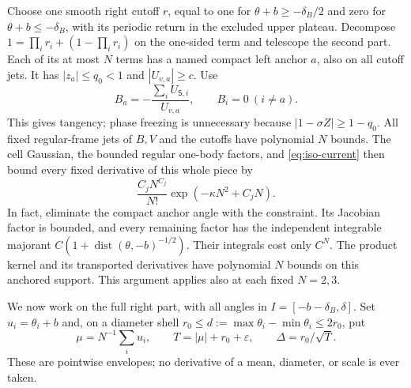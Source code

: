\documentclass[11pt]{article}
\numberwithin{equation}{section}
\theoremstyle{definition}
\newcommand{\eps}{\varepsilon}
\begin{document}
Choose one smooth right cutoff $r$, equal to one for
$\theta+b\ge-\delta_B/2$ and zero for $\theta+b\le-\delta_B$,
with its periodic return in the excluded upper plateau.  Decompose
$1=\prod_i r_i+(1-\prod_i r_i)$ on the one-sided term and telescope
the second part.  Each of its at most $N$ terms has a named compact
left anchor $a$, also on all cutoff jets.  It has
$|z_a|\le q_0<1$ and $|U_{v,a}|\ge c$.  Use
\begin{equation}\label{eq:iso-anchor-field}
 B_a=-\frac{\sum_iU_{\mathsf S,i}}{U_{v,a}},\qquad B_i=0\ (i\ne a).
\end{equation}
This gives tangency; phase freezing is unnecessary because
$|1-\sigma Z|\ge1-q_0$.  All fixed regular-frame jets of $B,V$ and
the cutoffs have polynomial $N$ bounds.  The cell Gaussian, the
bounded regular one-body factors, and \eqref{eq:iso-current} then
bound every fixed derivative of this whole piece by
\begin{equation}\label{eq:iso-anchor-bound}
 \frac{C_jN^{C_j}}{N!}\exp(-\kappa N^2+C_jN).
\end{equation}
In fact, eliminate the compact anchor angle with the constraint.
Its Jacobian factor is bounded, and every remaining factor has the
independent integrable majorant
$C(1+\operatorname{dist}(\theta,-b)^{-1/2})$.
Their integrals cost only $C^N$.  The product kernel and its
transported derivatives have polynomial $N$ bounds on this anchored
support.  This argument applies also at each fixed $N=2,3$.

We now work on the full right part, with all angles in
$I=[-b-\delta_B,\delta]$.  Set $u_i=\theta_i+b$ and, on a diameter
shell $r_0\le d:=\max\theta_i-\min\theta_i\le2r_0$, put
\begin{equation}\label{eq:iso-scales}
 \mu=N^{-1}\sum_i u_i,\qquad
 T=|\mu|+r_0+\eps,\qquad \Delta=r_0/\sqrt T.
\end{equation}
These are pointwise envelopes; no derivative of a mean, diameter,
or scale is ever taken.
\end{document}

